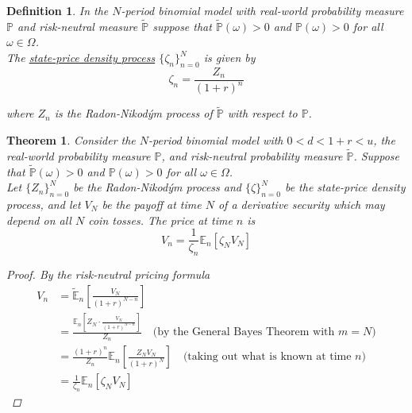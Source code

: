 \documentclass[12pt]{article}
\newtheorem{definition}{Definition}
\newtheorem{theorem}{Theorem}
\newlength\tindent
\renewcommand{\indent}{\hspace*{\tindent}}
\renewcommand{\P}{\mathbb P}
\newcommand{\E}{\mathbb E}
\begin{document}
\begin{definition} In the $N$-period binomial model with real-world probability measure $\P$ and risk-neutral measure $\tilde{\P}$ suppose that $\tilde{\P}(\omega) > 0$ and $\P(\omega) > 0$ for all $\omega \in \Omega$. \\

The \underline{state-price density process} $\{\zeta_n\}^N_{n = 0}$ is given by
\begin{equation*}
	\zeta_n = \frac{Z_n}{(1 + r)^n}
\end{equation*}

where $Z_n$ is the Radon-Nikod\'{y}m process of $\tilde{\P}$ with respect to $\P$.
\end{definition}

\begin{theorem} Consider the $N$-period binomial model with $0 < d < 1 + r < u$, the real-world probability measure $\P$, and risk-neutral probability measure $\tilde{\P}$. Suppose that $\tilde{\P}(\omega) > 0$ and $\P(\omega) > 0$ for all $\omega \in \Omega$. \\

\indent Let $\{Z_n\}^N_{n = 0}$ be the Radon-Nikod\'{y}m process and $\{\zeta\}^N_{n = 0}$ be the state-price density process, and let $V_N$ be the payoff at time $N$ of a derivative security which may depend on all $N$ coin tosses. The price at time $n$ is
\begin{equation*}
	V_n = \frac{1}{\zeta_n} \E_n[\zeta_NV_N]
\end{equation*}

\begin{proof} By the risk-neutral pricing formula
\begin{align*}
	V_n &= \tilde{\E}_n \left[ \frac{V_N}{(1 + r)^{N - n}} \right] \\
	&= \frac{\E_n \left[ Z_N \cdot \frac{V_N}{(1 + r)^{N - n}} \right] }{Z_n} \quad \text{(by the General Bayes Theorem with $m = N$)} \\
	&= \frac{(1 + r)^n}{Z_n} \E_n \left[ \frac{Z_N V_N}{(1 + r)^N} \right] \quad \text{(taking out what is known at time $n$)} \\
	&= \frac{1}{\zeta_n} \E_n [\zeta_NV_N]
\end{align*}
\end{proof}

\end{theorem}
\end{document}
